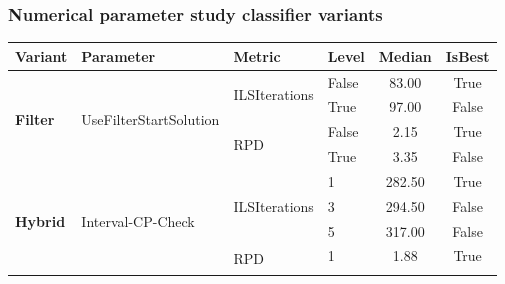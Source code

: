 \subsubsection{Numerical parameter study classifier variants}
\begin{table}[!ht]
	\tiny
	\centering
	\renewcommand{\multirowsetup}{\centering}
	\begin{tabular}{@{}l l l l c c @{}}
		\toprule
		\textbf{Variant}                      & \textbf{Parameter}                           & \textbf{Metric}                     & \textbf{Level}       & \textbf{Median} & \textbf{IsBest} \\
		\midrule
		\multirow[t]{4}{*}{\textbf{Filter}}   & \multirow[t]{4}{*}{UseFilterStartSolution}   & \multirow[t]{2}{*}{ILSIterations}   & False                & 83.00           & True            \\\cmidrule(lr){4-6}
		                                      &                                              &                                     & True                 & 97.00           & False           \\\cmidrule(lr){3-6}
		                                      &                                              & \multirow[t]{2}{*}{RPD}             & False                & 2.15            & True            \\\cmidrule(lr){4-6}
		                                      &                                              &                                     & True                 & 3.35            & False           \\\midrule
		\multirow[t]{24}{*}{\textbf{Hybrid}}  & \multirow[t]{9}{*}{Interval-CP-Check}        & \multirow[t]{3}{*}{ILSIterations}   & 1                    & 282.50          & True            \\\cmidrule(lr){4-6}
		                                      &                                              &                                     & 3                    & 294.50          & False           \\\cmidrule(lr){4-6}
		                                      &                                              &                                     & 5                    & 317.00          & False           \\\cmidrule(lr){3-6}
		                                      &                                              & \multirow[t]{3}{*}{RPD}             & 1                    & 1.88            & True            \\\cmidrule(lr){4-6}

\end{tabular}
\end{table}
